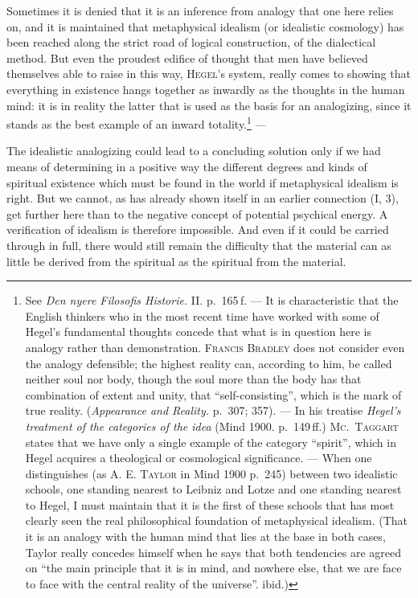 \documentclass[12pt,a4paper]{book}
\newcommand{\opage}[1]{\marginnote{\footnotesize\textit{[#1]}}}
\begin{document}
Sometimes it is denied that it is an inference from analogy that one here relies
on, and it is maintained that metaphysical idealism (or idealistic cosmology) has
been reached along the strict road of logical construction, of the dialectical
method. But even the proudest edifice of thought that men have believed
themselves able to raise in this way, \textsc{Hegel}'s system, really comes to
showing that everything in existence hangs together as inwardly as the thoughts
in the human mind: it is in reality the latter that is used as the basis for an
analogizing, since it stands as the best example of an inward
totality.\footnote{See \textit{Den nyere Filosofis Historie.} II. p.~165\,f. ---
It is characteristic that the English thinkers who in the most recent time have
worked with \opage{90}some of Hegel's fundamental thoughts concede that what is in question
here is analogy rather than demonstration. \textsc{Francis Bradley} does not
consider even the analogy defensible; the highest reality can, according to him,
be called neither soul nor body, though the soul more than the body has that
combination of extent and unity, that ``self-consisting'', which is the mark of
true reality. (\textit{Appearance and Reality.} p.~307; 357). --- In his treatise
\textit{Hegel's treatment of the categories of the idea} (Mind 1900. p.~149\,ff.)
\textsc{Mc.~Taggart} states that we have only a single example of the category
``spirit'', which in Hegel acquires a theological or cosmological significance.
--- When one distinguishes (as \textsc{A. E. Taylor} in Mind 1900 p.~245) between
two idealistic schools, one standing nearest to Leibniz and Lotze and one
standing nearest to Hegel, I must maintain that it is the first of these schools
that has most clearly seen the real philosophical foundation of metaphysical
idealism. (That it is an analogy with the human mind that lies at the base in
both cases, Taylor really concedes himself when he says that both tendencies are
agreed on ``the main principle that it is in mind, and nowhere else, that we are
face to face with the central reality of the universe''. ibid.)} ---

The idealistic analogizing could lead to a concluding solution only if we had
means of determining in a positive way the different degrees and kinds of
spiritual existence which must be found in the world if metaphysical idealism is
right. But we cannot, as has already shown itself in an earlier connection
(I, 3), get further here than to the negative concept of potential psychical
energy. A verification of idealism is therefore impossible. And even if it could
be carried through in full, there would still remain the difficulty that the
material can as little be derived from the spiritual as the spiritual from the
material.
\end{document}
